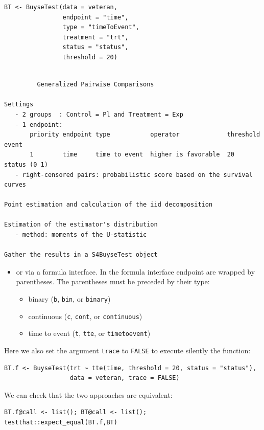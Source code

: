 \documentclass[12pt]{article}
\begin{document}
\lstset{language=r,label= ,caption= ,captionpos=b,numbers=none}
\begin{lstlisting}
BT <- BuyseTest(data = veteran, 
                endpoint = "time", 
                type = "timeToEvent", 
                treatment = "trt", 
                status = "status", 
                threshold = 20)
\end{lstlisting}

\begin{verbatim}

         Generalized Pairwise Comparisons

Settings 
   - 2 groups  : Control = Pl and Treatment = Exp
   - 1 endpoint: 
       priority endpoint type           operator             threshold event       
       1        time     time to event  higher is favorable  20        status (0 1)
   - right-censored pairs: probabilistic score based on the survival curves 

Point estimation and calculation of the iid decomposition

Estimation of the estimator's distribution 
   - method: moments of the U-statistic

Gather the results in a S4BuyseTest object
\end{verbatim}

\clearpage

\begin{itemize}
\item or via a formula interface. In the formula interface endpoint are
wrapped by parentheses. The parentheses must be preceded by their
type: 
\begin{itemize}[label={-}]
\item binary (\texttt{b}, \texttt{bin}, or \texttt{binary})
\item continuous (\texttt{c}, \texttt{cont}, or  \texttt{continuous})
\item time to event (\texttt{t}, \texttt{tte}, or \texttt{timetoevent})
\end{itemize}
\end{itemize}
Here we also set the argument \texttt{trace} to \texttt{FALSE} to execute silently
the function:
\lstset{language=r,label= ,caption= ,captionpos=b,numbers=none}
\begin{lstlisting}
BT.f <- BuyseTest(trt ~ tte(time, threshold = 20, status = "status"),
                  data = veteran, trace = FALSE)
\end{lstlisting}

We can check that the two approaches are equivalent:
\lstset{language=r,label= ,caption= ,captionpos=b,numbers=none}
\begin{lstlisting}
BT.f@call <- list(); BT@call <- list();
testthat::expect_equal(BT.f,BT)
\end{lstlisting}
\end{document}
